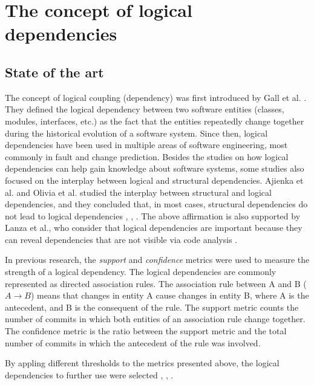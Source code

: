 \documentclass[runningheads]{comsis2}
\begin{document}
\section{The concept of logical dependencies}

\subsection{State of the art}

The concept of logical coupling (dependency) was first introduced by Gall et al. \cite{Gall:1998:DLC:850947.853338}. They defined the logical dependency between two software entities (classes, modules, interfaces, etc.) as the fact that the entities repeatedly change together during the historical evolution of a software system.
Since then, logical dependencies have been used in multiple areas of software engineering, most commonly in fault and change prediction.  
Besides the studies on how logical dependencies can help gain knowledge about software systems, some studies also focused on the interplay between logical and structural dependencies. Ajienka et al. and Olivia et al. studied the interplay between structural and logical dependencies, and they concluded that, in most cases, structural dependencies do not lead to logical dependencies \cite{Oliva:2011:ISL:2067853.2068086}, \cite{DBLP:conf/issre/OlivaG15}, \cite{DBLP:journals/jss/AjienkaC17}. The above affirmation is also supported by Lanza et al., who consider that logical dependencies are important because they can reveal dependencies that are not visible via code analysis \cite{inproceedings_radar_evolution}.



In previous research, the \textit{support} and \textit{confidence} metrics were used to measure the strength of a logical dependency. 
The logical dependencies are commonly represented as directed association rules. The association rule between A and B ( $A \rightarrow B$) means that changes in entity A cause changes in entity B, where A is the antecedent, and B is the consequent of the rule. 
The support metric counts the number of commits in which both entities of an association rule change together. The confidence metric is the ratio between the support metric and the total number of commits in which the antecedent of the rule was involved. 

By appling different thresholds to the metrics presented above, the logical dependencies to further use were selected \cite{DBLP:conf/issre/OlivaG15}, \cite{DBLP:journals/jss/AjienkaC17}, \cite{Zimmermann:2004:MVH:998675.999460}.
\end{document}
